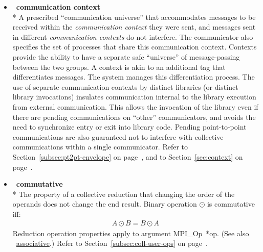 \begin{itemize}
\label{glossary:communication_context}
\item  ~\hypertarget{glossary:communication_context}{\textbf{communication context}} \\*
A prescribed ``communication universe'' that accommodates messages to be 
received within the \emph{communication context} they were sent, and messages 
sent in different \emph{communication contexts} do not interfere.
The communicator also specifies the set of processes that share this
communication context.
Contexts provide the ability to have
a separate safe ``universe''
of message-passing between the two groups.  
A context is akin to an additional
tag that differentiates messages.
The system manages this differentiation process.
The use of separate communication
contexts by distinct libraries (or distinct library invocations)
insulates communication internal to the library execution from
external communication.  This allows the invocation of the library even if
there are pending communications
on ``other'' communicators, and avoids the need to
synchronize entry or exit into library code.  Pending point-to-point
communications are also guaranteed not to interfere with collective
communications within a single communicator.
 Refer to Section~\ref{subsec:pt2pt-envelope} on page~\pageref{subsec:pt2pt-envelope},
 and to Section~\ref{sec:context} on page~\pageref{sec:context}.

\label{glossary:commutative}
\item  ~\hypertarget{glossary:commutative}{\textbf{commutative}} \\*
The property of a collective reduction that changing the order of the operands does not change the end result. 
Binary operation $ \odot $ is commutative iff:
\begin{eqnarray}
A \odot B = B \odot A
\end{eqnarray}
Reduction operation properties apply to  argument MPI\_Op~*op.
(See also ~\hyperlink{glossary:associative}{associative}.)
Refer to Section~\ref{subsec:coll-user-ops} on page~\pageref{subsec:coll-user-ops}.


\end{itemize}
